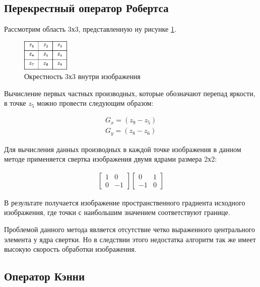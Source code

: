 \subsection{Перекрестный оператор Робертса}

Рассмотрим область 3х3, представленную ну рисунке \ref{fig:roberst}.

\begin{figure}[!h]
	\centering
	\includegraphics[width=0.2\textwidth,keepaspectratio]{figures/ru/roberts}
	\caption{Окрестность 3х3 внутри изображения}
	\label{fig:roberst}
\end{figure}

Вычисление первых частных производных, которые обозначают перепад яркости, в точке $z_5$ можно провести следующим образом:

\begin{eqnarray}\label{eq:roberts-eq}
G_x = (z_9 - z_5) \\
G_y = (z_8 - z_6)
\end{eqnarray}

Для вычисления данных производных в каждой точке изображения в данном методе\cite{Roberts} применяется свертка изображения двумя ядрами размера 2х2:

\begin{eqnarray}\label{eq:roberts-matrixs}
\begin{bmatrix}
1 & 0\\
0 & -1
\end{bmatrix} 
\begin{bmatrix}
0 & 1\\
-1 & 0
\end{bmatrix}
\end{eqnarray}

В результате получается изображение пространственного градиента исходного изображения, где точки с наибольшим значением соответствуют границе.

Проблемой данного метода является отсутствие четко выраженного центрального элемента у ядра свертки. Но в следствии этого недостатка алгоритм так же имеет высокую скорость обработки изображения.

\subsection{Оператор Кэнни}


